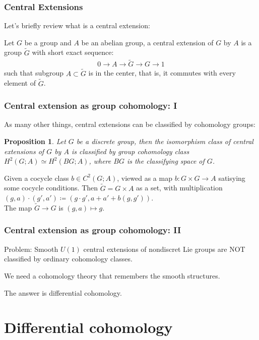 \documentclass{beamer}
\newtheorem{prop}[equation]{Proposition}
\begin{document}
\begin{frame}
    \frametitle{Central Extensions}
    Let's briefly review what is a central extension: \pause
    \begin{definition}
        Let $G$ be a group and $A$ be an abelian group, a central extension of $G$
        by $A$ is a group $\tilde{G}$ with short exact sequence:
        \begin{eqnarray}
            0 \to A \to \tilde{G} \to G \to 1
        \end{eqnarray}
        such that subgroup $A \subset \tilde{G}$ is in the center, that is, 
        it commutes with every element of $\tilde{G}$.
    \end{definition}
\end{frame}

\begin{frame}
    \frametitle{Central extension as group cohomology: I}
    As many other things, central extensions can be classified by cohomology groups: \pause 
    
    \begin{prop}
        Let $G$ be a discrete group, then the isomorphism class of central extensions of $G$ by $A$ is 
        classified by group cohomology class $H^2(G; A) \simeq H^2(BG; A)$, where $BG$ is the 
        classifying space of $G$.
    \end{prop}\pause

    Given a cocycle class $b \in C^2(G;A)$, viewed as a map $b : G \times G \to A$ 
    satisying some cocycle conditions. Then $\tilde{G} = G \times A$ as a set, with multiplication 
    $(g, a) \cdot (g', a') \coloneqq (g \cdot g', a + a' + b(g, g'))$. \pause \\
    The map $\tilde{G} \to G$ is  $(g, a) \mapsto g$.
\end{frame}

\begin{frame}
    \frametitle{Central extension as group cohomology: II}
    \alert{Problem}:  Smooth $U(1)$ central extensions of nondiscret Lie groups are \alert{NOT} classified 
    by ordinary cohomology classes. \pause \vspace{5mm}

    We need a cohomology theory that remembers the smooth structures. \pause 

    \vspace{5mm} The answer is \alert{differential cohomology}.
\end{frame}


\section{Differential cohomology}
\end{document}
